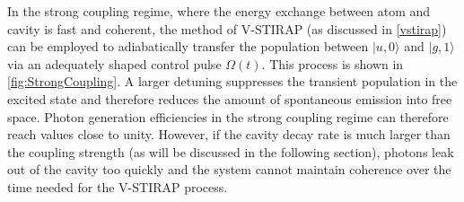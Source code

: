 \documentclass[../Thesis-IJspeert.tex]{subfiles}
\begin{document}
In the strong coupling regime, where the energy exchange between atom and cavity is fast and coherent, the method of V-STIRAP (as discussed in \autoref{vstirap}) can be employed to adiabatically transfer the population between $\vert u, 0\rangle$ and $\vert g, 1\rangle$ via an adequately shaped control pulse $\Omega(t)$. This process is shown in \autoref{fig:StrongCoupling}. A larger detuning suppresses the transient population in the excited state and therefore reduces the amount of spontaneous emission into free space. Photon generation efficiencies in the strong coupling regime can therefore reach values close to unity. However, if the cavity decay rate is much larger than the coupling strength (as will be discussed in the following section), photons leak out of the cavity too quickly and the system cannot maintain coherence over the time needed for the V-STIRAP process.
\end{document}
